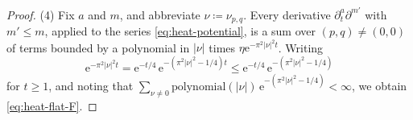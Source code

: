 \documentclass[10pt,a4paper]{amsart}
\begin{document}
\begin{proof}
		(4)  Fix $a$ and $m$, and abbreviate $\nu\coloneqq\nu_{p,q}$.  Every
		derivative $\partial_t^a\partial^{m'}$ with $m'\le m$, applied to the
		series \eqref{eq:heat-potential}, is a sum over $(p,q)\ne(0,0)$ of terms
		bounded by a polynomial in $|\nu|$ times
		$\eta\mathrm{e}^{-\pi^2|\nu|^2t}$.  Writing
		\[
		\mathrm{e}^{-\pi^2|\nu|^2t}
		=\mathrm{e}^{-t/4}\,\mathrm{e}^{-(\pi^2|\nu|^2-1/4)t}
		\le \mathrm{e}^{-t/4}\,\mathrm{e}^{-(\pi^2|\nu|^2-1/4)}
		\]
		for $t\ge1$, and noting that
		$\sum_{\nu\ne 0}\mathrm{polynomial}(|\nu|)\,
		\mathrm{e}^{-(\pi^2|\nu|^2-1/4)}<\infty$, we obtain
		\eqref{eq:heat-flat-F}.
	\end{proof}
\end{document}
